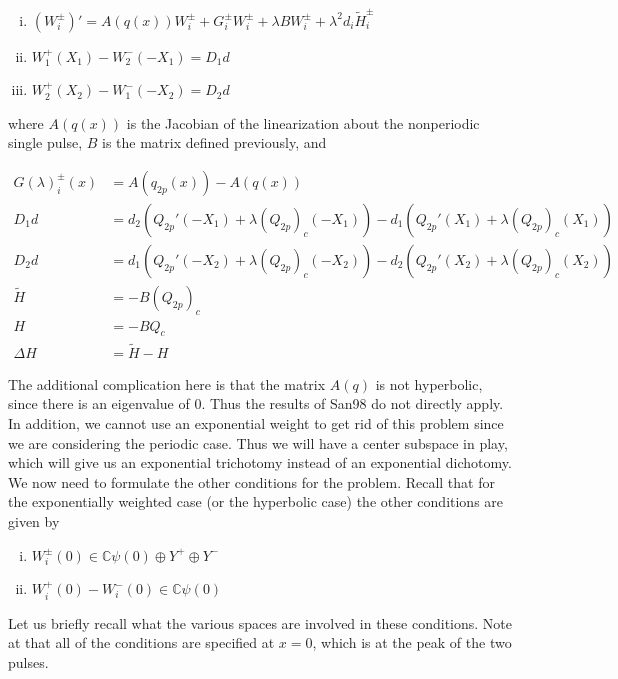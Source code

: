 \documentclass[12pt]{article}
\def\C{{\mathbb C}}
\begin{document}
\begin{enumerate}[(i)]
\item $(W_i^\pm)' = A(q(x)) W_i^\pm + G_i^\pm W_i^\pm + \lambda B W_i^\pm + \lambda^2 d_i \tilde{H}_i^\pm$
\item $W_1^+(X_1) - W_2^-(-X_1) = D_1 d$
\item $W_2^+(X_2) - W_1^-(-X_2) = D_2 d$
\end{enumerate}

where $A(q(x))$ is the Jacobian of the linearization about the nonperiodic single pulse, $B$ is the matrix defined previously, and 

\begin{align*}
G(\lambda)_i^\pm (x) &= A(q_{2p}(x)) - A(q(x)) \\
D_1 d &= d_2(Q_{2p}'(-X_1) + \lambda (Q_{2p})_c(-X_1))
- d_1 ( Q_{2p}'(X_1) + \lambda (Q_{2p})_c(X_1) ) \\
D_2 d &= d_1(Q_{2p}'(-X_2) + \lambda (Q_{2p})_c(-X_2))
- d_2 ( Q_{2p}'(X_2) + \lambda (Q_{2p})_c(X_2) ) \\
\tilde{H} &= -B(Q_{2p})_c \\
H &= -B Q_c \\
\Delta H &= \tilde{H} - H
\end{align*}

The additional complication here is that the matrix $A(q)$ is not hyperbolic, since there is an eigenvalue of 0. Thus the results of San98 do not directly apply. In addition, we cannot use an exponential weight to get rid of this problem since we are considering the periodic case. Thus we will have a center subspace in play, which will give us an exponential trichotomy instead of an exponential dichotomy.\\

We now need to formulate the other conditions for the problem. Recall that for the exponentially weighted case (or the hyperbolic case) the other conditions are given by

\begin{enumerate}[(i)]
\item $W_i^\pm(0) \in \C \psi(0) \oplus Y^+ \oplus Y^-$
\item $W_i^+(0) - W_i^-(0) \in \C \psi(0)$
\end{enumerate}

Let us briefly recall what the various spaces are involved in these conditions. Note at that all of the conditions are specified at $x = 0$, which is at the peak of the two pulses.
\end{document}
